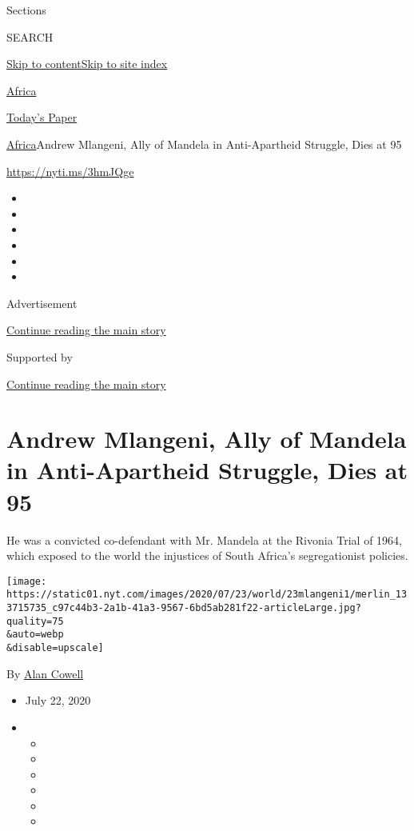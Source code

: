 Sections

SEARCH

\protect\hyperlink{site-content}{Skip to
content}\protect\hyperlink{site-index}{Skip to site index}

\href{https://www.nytimes.com/section/world/africa}{Africa}

\href{https://myaccount.nytimes.com/auth/login?response_type=cookie\&client_id=vi}{}

\href{https://www.nytimes.com/section/todayspaper}{Today's Paper}

\href{/section/world/africa}{Africa}\textbar{}Andrew Mlangeni, Ally of
Mandela in Anti-Apartheid Struggle, Dies at 95

\url{https://nyti.ms/3hmJQge}

\begin{itemize}
\item
\item
\item
\item
\item
\item
\end{itemize}

Advertisement

\protect\hyperlink{after-top}{Continue reading the main story}

Supported by

\protect\hyperlink{after-sponsor}{Continue reading the main story}

\hypertarget{andrew-mlangeni-ally-of-mandela-in-anti-apartheid-struggle-dies-at-95}{%
\section{Andrew Mlangeni, Ally of Mandela in Anti-Apartheid Struggle,
Dies at
95}\label{andrew-mlangeni-ally-of-mandela-in-anti-apartheid-struggle-dies-at-95}}

He was a convicted co-defendant with Mr. Mandela at the Rivonia Trial of
1964, which exposed to the world the injustices of South Africa's
segregationist policies.

\texttt{[image: https://static01.nyt.com/images/2020/07/23/world/23mlangeni1/merlin\_133715735\_c97c44b3-2a1b-41a3-9567-6bd5ab281f22-articleLarge.jpg?quality=75\\\&auto=webp\\\&disable=upscale]}

By \href{https://www.nytimes.com/by/alan-cowell}{Alan Cowell}

\begin{itemize}
\item
  July 22, 2020
\item
  \begin{itemize}
  \item
  \item
  \item
  \item
  \item
  \item
  \end{itemize}
\end{itemize}


